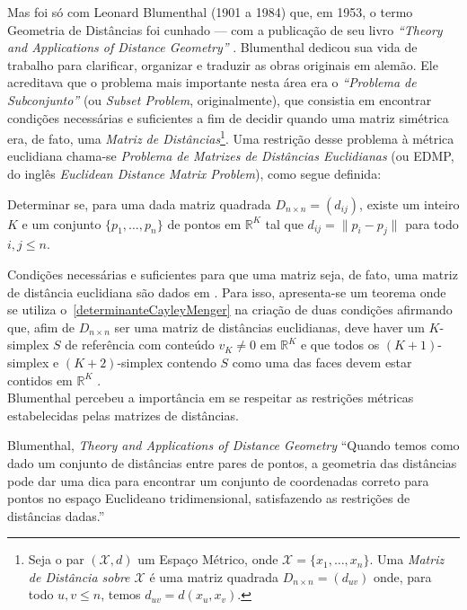 Mas foi só com Leonard Blumenthal (1901 a 1984) que, em 1953, o termo Geometria de Distâncias foi cunhado --- com a publicação de seu livro \textit{``Theory and Applications of Distance Geometry''} \cite{Blumenthal:53}.
Blumenthal dedicou sua vida de trabalho para clarificar, organizar e traduzir as obras originais em alemão. Ele acreditava que o problema mais importante nesta área era o \textit{``Problema de Subconjunto''} (ou \textit{Subset Problem}, originalmente), que consistia em encontrar condições necessárias e suficientes a fim de decidir quando uma matriz simétrica era, de fato, uma \textit{Matriz de Distâncias}\footnote{Seja o par $(\mathcal{X}, d)$ um Espaço Métrico, onde $\mathcal{X} = \{x_1, \dots, x_n\}$. Uma \textit{Matriz de Distância sobre $\mathcal{X}$} é uma matriz quadrada $D_{n\times n} = (d_{uv})$ onde, para todo $u,v \leq n$, temos $d_{uv} = d(x_u,x_v)$.}. Uma restrição desse problema à métrica euclidiana chama-se \textit{Problema de Matrizes de Distâncias Euclidianas} (ou EDMP, do inglês \textit{Euclidean Distance Matrix Problem}), como segue definida:

\begin{definicao}
	\label{EDMP}
	Determinar se, para uma dada matriz quadrada $D_{n\times n} = (d_{ij})$, existe um inteiro $K$ e um conjunto $\{p_1, \dots, p_n \}$ de pontos em $\mathbb{R}^K$ tal que $d_{ij} = \lVert p_i - p_j\rVert$ para todo $i,j \leq n$.
\end{definicao}

Condições necessárias e suficientes para que uma matriz seja, de fato, uma matriz de distância euclidiana são dados em \cite{EDMPResolucao}. Para isso, apresenta-se um teorema onde se utiliza o~\ref{determinanteCayleyMenger} na criação de duas condições afirmando que, afim de $D_{n\times n}$ ser uma matriz de distâncias euclidianas, deve haver um $K$-simplex $S$ de referência com conteúdo $v_K \neq 0$ em $\mathbb{R}^K$ e que todos os $(K+1)$-simplex e $(K+2)$-simplex contendo $S$ como uma das faces devem estar contidos em $\mathbb{R}^K$ \cite{carlileGDandAplications}.
\\

Blumenthal percebeu a importância em se respeitar as restrições métricas estabelecidas pelas matrizes de distâncias.
\\

\begin{chapquote}{Blumenthal, \textit{Theory and Applications of Distance Geometry} \cite{Blumenthal:53}}
	``Quando temos como dado um conjunto de distâncias entre pares de pontos, a geometria das distâncias pode dar uma dica para encontrar um conjunto de coordenadas correto para pontos no espaço Euclideano tridimensional, satisfazendo as restrições de distâncias dadas.''
\end{chapquote}

